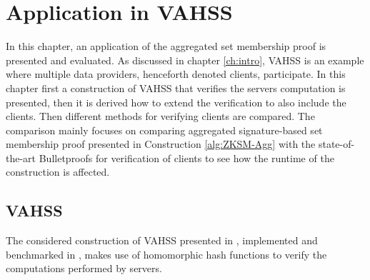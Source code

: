 \chapter{Application in VAHSS}
\label{ch:VAHSS}
In this chapter, an application of the aggregated set membership proof is presented and evaluated. As discussed in chapter \ref{ch:intro}, VAHSS is an example where multiple data providers, henceforth denoted clients, participate. In this chapter first a construction of VAHSS  that verifies the servers computation is presented, then it is derived how to extend the verification to also include the clients. 
Then different methods for verifying clients are compared. The comparison   mainly focuses on comparing aggregated signature-based set membership proof presented in Construction \ref{alg:ZKSM-Agg} with the state-of-the-art Bulletproofs for verification of clients to see how the runtime of the construction is affected.


\section{VAHSS}
\label{sec:VAHSS-HSS}
The considered construction of VAHSS presented in \cite{SumItUp}, implemented and benchmarked in \cite{VAHSS}, makes use of homomorphic hash functions to verify the computations performed by servers.



